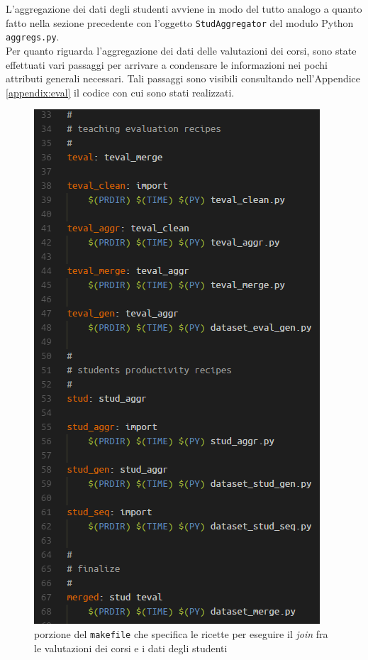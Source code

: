 		L'aggregazione dei dati degli studenti avviene in modo del tutto analogo a quanto fatto nella sezione precedente con l'oggetto \texttt{StudAggregator} del modulo Python \texttt{aggregs.py}. \\

		Per quanto riguarda l'aggregazione dei dati delle valutazioni dei corsi, sono state effettuati vari passaggi per arrivare a condensare le informazioni nei pochi attributi generali necessari. Tali passaggi sono visibili consultando nell'Appendice \ref{appendix:eval} il codice con cui sono stati realizzati. \\

		\begin{figure}
			\centering
			\caption{porzione del \texttt{makefile} che specifica le ricette per eseguire il \textit{join} fra le valutazioni dei corsi e i dati degli studenti}
			\label{make_join}
			\includegraphics[scale=0.80]{img/make_join.png}
		\end{figure}

